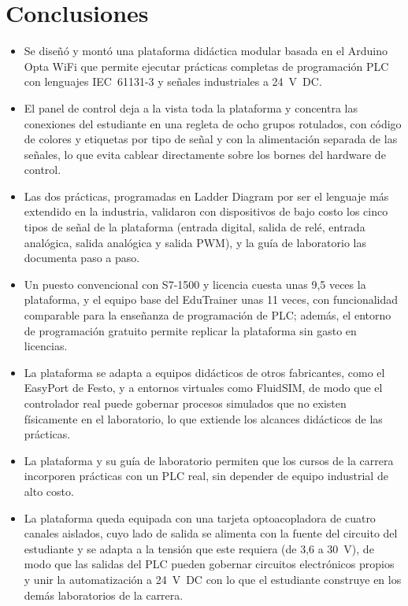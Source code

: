 \documentclass[12pt,a4paper,oneside]{report}
\begin{document}
\section{Conclusiones}

\begin{itemize}
    \item Se diseñó y montó una plataforma didáctica modular basada en el Arduino Opta WiFi que permite ejecutar prácticas completas de programación PLC con lenguajes IEC~61131-3 y señales industriales a 24~V~DC.
    \item El panel de control deja a la vista toda la plataforma y concentra las conexiones del estudiante en una regleta de ocho grupos rotulados, con código de colores y etiquetas por tipo de señal y con la alimentación separada de las señales, lo que evita cablear directamente sobre los bornes del hardware de control.
    \item Las dos prácticas, programadas en Ladder Diagram por ser el lenguaje más extendido en la industria, validaron con dispositivos de bajo costo los cinco tipos de señal de la plataforma (entrada digital, salida de relé, entrada analógica, salida analógica y salida PWM), y la guía de laboratorio las documenta paso a paso.
    \item Un puesto convencional con S7-1500 y licencia cuesta unas 9,5 veces la plataforma, y el equipo base del EduTrainer unas 11 veces, con funcionalidad comparable para la enseñanza de programación de PLC; además, el entorno de programación gratuito permite replicar la plataforma sin gasto en licencias.
    \item La plataforma se adapta a equipos didácticos de otros fabricantes, como el EasyPort de Festo, y a entornos virtuales como FluidSIM, de modo que el controlador real puede gobernar procesos simulados que no existen físicamente en el laboratorio, lo que extiende los alcances didácticos de las prácticas.
    \item La plataforma y su guía de laboratorio permiten que los cursos de la carrera incorporen prácticas con un PLC real, sin depender de equipo industrial de alto costo.
    \item La plataforma queda equipada con una tarjeta optoacopladora de cuatro canales aislados, cuyo lado de salida se alimenta con la fuente del circuito del estudiante y se adapta a la tensión que este requiera (de 3,6 a 30~V), de modo que las salidas del PLC pueden gobernar circuitos electrónicos propios y unir la automatización a 24~V~DC con lo que el estudiante construye en los demás laboratorios de la carrera.
\end{itemize}
\end{document}
